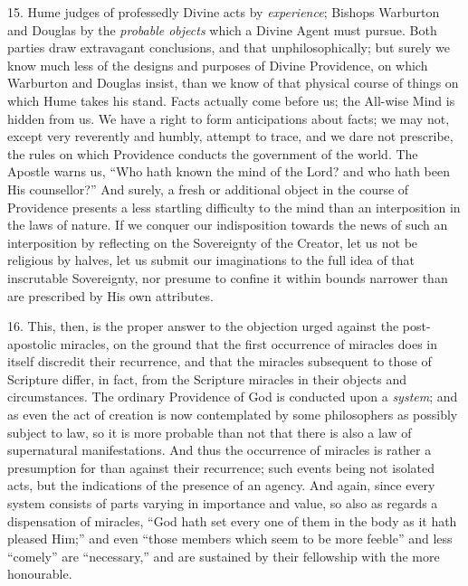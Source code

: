 15.
Hume judges of professedly Divine acts by \emph{experience}; Bishops
Warburton and Douglas by the \emph{probable objects} which a Divine
Agent must pursue. Both parties draw extravagant conclusions, and that
unphilosophically; but surely we know much less of the designs and
purposes of Divine Providence, on which Warburton and Douglas insist,
than we know of that physical course of things on which Hume takes his
stand. Facts actually come before us; the All-wise Mind is hidden from
us. We have a right to form anticipations about facts; we may not,
except very reverently and humbly, attempt to trace, and we dare not
prescribe, the rules on which Providence conducts the government of
the world. The Apostle warns us, ``Who hath known the mind of the
Lord? and who hath been His counsellor?'' And surely, a fresh or
additional object in the course of Providence presents a less
startling difficulty to the mind than an interposition in the laws of
nature. If we conquer our indisposition towards the news of such an
interposition by reflecting on the Sovereignty of the Creator, let us
not be religious by halves, let us submit our imaginations to the full
idea of that inscrutable Sovereignty, nor presume to confine it
within bounds narrower than are prescribed by His own attributes.

16.
This, then, is the proper answer to the objection urged against the
post-apostolic miracles, on the ground that the first occurrence of
miracles does in itself discredit their recurrence, and that the
miracles subsequent to those of Scripture differ, in fact, from the
Scripture miracles in their objects and circumstances. The ordinary
Providence of God is conducted upon a \emph{system}; and as even the
act of creation is now contemplated by some philosophers as possibly
subject to law, so it is more probable than not that there is also a
law of supernatural manifestations. And thus the occurrence of
miracles is rather a presumption for than against their recurrence;
such events being not isolated acts, but the indications of the
presence of an agency. And again, since every system consists of parts
varying in importance and value, so also as regards a dispensation of
miracles, ``God hath set every one of them in the body as it hath
pleased Him;'' and even ``those members which seem to be more
feeble'' and less ``comely'' are ``necessary,'' and are sustained
by their fellowship with the more honourable.

